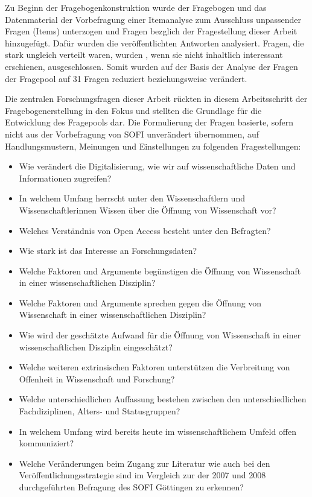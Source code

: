 Zu Beginn der Fragebogenkonstruktion wurde der Fragebogen und das Datenmaterial der Vorbefragung einer Itemanalyse zum Ausschluss unpassender Fragen (Items) unterzogen und Fragen bezglich der Fragestellung dieser Arbeit hinzugefügt. Dafür wurden die veröffentlichten Antworten analysiert. Fragen, die stark ungleich verteilt waren, wurden , wenn sie nicht inhaltlich interessant erschienen, ausgeschlossen.  Somit wurden auf der Basis der Analyse der Fragen der Fragepool auf 31 Fragen reduziert beziehungsweise verändert.

Die zentralen Forschungsfragen dieser Arbeit rückten in diesem Arbeitsschritt der Fragebogenerstellung in den Fokus und stellten die Grundlage für die Entwicklung des Fragepools dar. Die Formulierung der Fragen basierte, sofern nicht aus der Vorbefragung von SOFI unverändert übernommen, auf Handlungsmustern, Meinungen und Einstellungen zu folgenden Fragestellungen:
\begin{itemize}
\item Wie verändert die Digitalisierung, wie wir auf wissenschaftliche Daten und Informationen zugreifen?
\item In welchem Umfang herrscht unter den Wissenschaftlern und Wissenschaftlerinnen Wissen über die Öffnung von Wissenschaft vor? 
\item Welches Verständnis von Open Access besteht unter den Befragten? 
\item Wie stark ist das Interesse an Forschungsdaten? 
\item Welche Faktoren und Argumente begünstigen die Öffnung von Wissenschaft in einer wissenschaftlichen Disziplin? 
\item Welche Faktoren und Argumente sprechen gegen die Öffnung von Wissenschaft in einer wissenschaftlichen Disziplin? 
\item Wie wird der geschätzte Aufwand für die Öffnung von Wissenschaft in einer wissenschaftlichen Disziplin eingeschätzt?
\item Welche weiteren extrinsischen Faktoren unterstützen die Verbreitung von Offenheit in Wissenschaft und Forschung? 
\item Welche unterschiedlichen Auffassung bestehen zwischen den unterschiedlichen Fachdiziplinen, Alters- und Statusgruppen?
\item In welchem Umfang wird bereits heute im wissenschaftlichem Umfeld offen kommuniziert?
\item Welche Veränderungen beim Zugang zur Literatur wie auch bei den Veröffentlichungsstrategie sind im Vergleich zur der 2007 und 2008 durchgeführten Befragung des SOFI Göttingen zu erkennen?
\end{itemize}

